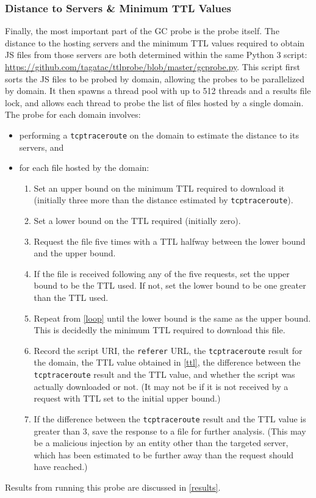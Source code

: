 \subsubsection{Distance to Servers \& Minimum TTL Values}\label{distance-ttl}
Finally, the most important part of the GC probe is the probe itself.
The distance to the hosting servers and the minimum TTL values required to obtain JS files from those servers are both determined within the same Python 3 script: \url{https://github.com/tagatac/ttlprobe/blob/master/gcprobe.py}.
This script first sorts the JS files to be probed by domain, allowing the probes to be parallelized by domain.
It then spawns a thread pool with up to 512 threads and a results file lock, and allows each thread to probe the list of files hosted by a single domain.
The probe for each domain involves:
\begin{itemize}\addtolength{\itemsep}{-.35\baselineskip}
	\item performing a \texttt{tcptraceroute} on the domain to estimate the distance to its servers, and
	\item for each file hosted by the domain:
	\begin{enumerate}
		\item Set an upper bound on the minimum TTL required to download it (initially three more than the distance estimated by \texttt{tcptraceroute}).
		\item Set a lower bound on the TTL required (initially zero).
		\item\label{loop} Request the file five times with a TTL halfway between the lower bound and the upper bound.
		\item If the file is received following any of the five requests, set the upper bound to be the TTL used.
			If not, set the lower bound to be one greater than the TTL used.
		\item\label{ttl} Repeat from \ref{loop} until the lower bound is the same as the upper bound.
			This is decidedly the minimum TTL required to download this file.
		\item Record the script URI, the \texttt{referer} URL, the \texttt{tcptraceroute} result for the domain, the TTL value obtained in \ref{ttl}, the difference between the \texttt{tcptraceroute} result and the TTL value, and whether the script was actually downloaded or not.
			(It may not be if it is not received by a request with TTL set to the initial upper bound.)
		\item If the difference between the \texttt{tcptraceroute} result and the TTL value is greater than 3, save the response to a file for further analysis.
			(This may be a malicious injection by an entity other than the targeted server, which has been estimated to be further away than the request should have reached.)
	\end{enumerate}
\end{itemize}
Results from running this probe are discussed in \autoref{results}.